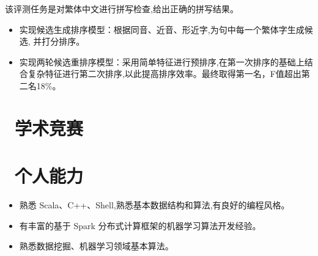 \documentclass{resume}
\begin{document}
\begin{onehalfspacing}
该评测任务是对繁体中文进行拼写检查,给出正确的拼写结果。
\begin{itemize}
  \item 实现候选生成排序模型：根据同音、近音、形近字,为句中每一个繁体字生成候选, 并打分排序。
  \item 实现两轮候选重排序模型：采用简单特征进行预排序,在第一次排序的基础上结合复杂特征进行第二次排序,以此提高排序效率。最终取得第一名，F值超出第二名18\%。
\end{itemize}
\end{onehalfspacing}


\section{\faHeart\ 学术竞赛}



\section{\faCogs\ 个人能力}
\begin{itemize}[parsep=0.5ex]
  \item 熟悉 Scala、C++、Shell,熟悉基本数据结构和算法,有良好的编程风格。
  \item 有丰富的基于 Spark 分布式计算框架的机器学习算法开发经验。
  \item 熟悉数据挖掘、机器学习领域基本算法。
\end{itemize}


%
%
\end{document}
